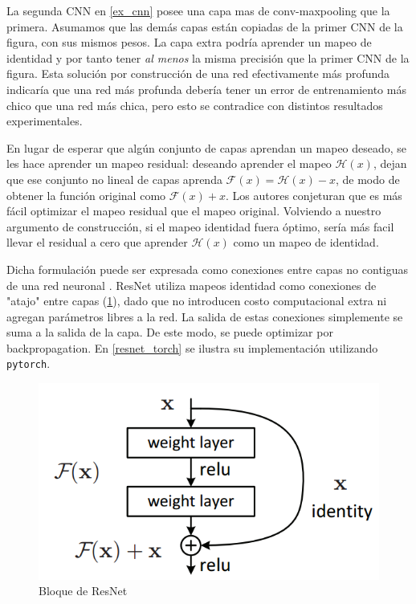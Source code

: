 \documentclass[titlepage,a4paper,oneside]{article}
\begin{document}
La segunda CNN en \ref{ex_cnn} posee una capa mas de conv-maxpooling que la primera. Asumamos que las demás capas están copiadas de la primer CNN de la figura, con sus mismos pesos. La capa extra podría aprender un mapeo de identidad y por tanto tener \textit{al menos} la misma precisión que la primer CNN de la figura. Esta solución por construcción de una red efectivamente más profunda indicaría que una red más profunda debería tener un error de entrenamiento más chico que una red más chica, pero esto se contradice con distintos resultados experimentales.

En lugar de esperar que algún conjunto de capas aprendan un mapeo deseado, se les hace aprender un mapeo residual: deseando aprender el mapeo $\mathscr{H}(x)$, dejan que ese conjunto no lineal de capas aprenda $\mathscr{F}(x) = \mathscr{H}(x) - x$, de modo de obtener la función original como $\mathscr{F}(x) + x$. Los autores conjeturan que es más fácil optimizar el mapeo residual que el mapeo original. Volviendo a nuestro argumento de construcción, si el mapeo identidad fuera óptimo, sería más facil llevar el residual a cero que aprender $\mathscr{H}(x)$ como un mapeo de identidad.

Dicha formulación puede ser expresada como conexiones entre capas no contiguas de una red neuronal \cite{srivastava2015highway}. ResNet utiliza mapeos identidad como conexiones de "atajo" entre capas (\ref{resnet_block}), dado que no introducen costo computacional extra ni agregan parámetros libres a la red. La salida de estas conexiones simplemente se suma a la salida de la capa. De este modo, se puede optimizar por backpropagation. En \ref{resnet_torch} se ilustra su implementación utilizando \texttt{pytorch}.

\begin{figure}[H]
\centering
\includegraphics[scale=0.5]{images/resnet_block.png}
\caption{Bloque de ResNet}
\label{resnet_block}
\end{figure}
\end{document}
